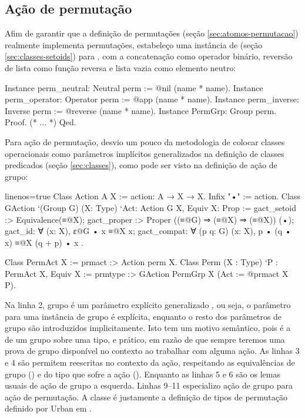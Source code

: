 \subsection{Ação de permutação}
Afim de garantir que a definição de permutações (seção \ref{sec:atomos-permutacao}) realmente implementa permutações, estabeleço uma instância de  (seção \ref{sec:classes-setoids}) para , com a concatenação como operador binário, reversão de lista como função reversa e lista vazia como elemento neutro:
\begin{coqcode}
Instance perm_neutral: Neutral perm := @nil (name * name).
Instance perm_operator: Operator perm := @app (name * name).
Instance perm_inverse: Inverse perm := @reverse (name * name).
Instance PermGrp: Group perm. Proof. (* ... *) Qed.
\end{coqcode}

Para ação de permutação, desvio um pouco da metodologia de colocar classes operacionais como parâmetros implícitos generalizados na definição de classes predicados (seção \ref{sec:classes}), como pode ser visto na definição de ação de grupo:
\begin{coqcode*}{linenos=true}
Class Action A X := action: A → X → X.    Infix "•" := action.
Class GAction `(Group G) (X: Type) `{Act: Action G X, Equiv X}: Prop := {
   gact_setoid :> Equivalence(≡@{X});
   gact_proper :> Proper ((≡@{G}) ⇒ (≡@{X}) ⇒ (≡@{X})) (•);
   gact_id: ∀ (x: X), ɛ@{G} • x ≡@{X} x;
   gact_compat: ∀ (p q: G) (x: X), p • (q • x) ≡@{X} (q + p) • x
}.

Class PermAct X := prmact :> Action perm X.
Class Perm (X : Type) `{P : PermAct X, Equiv X} := 
   prmtype :> GAction PermGrp X (Act := @prmact X P).
\end{coqcode*}
Na linha 2, grupo é um parâmetro explícito generalizado , ou seja, o parâmetro para uma instância de grupo é explícita, enquanto o resto dos parâmetros de grupo são introduzidos implicitamente. Isto tem um motivo semântico, pois é a de um grupo sobre uma tipo, e prático, em razão de que sempre teremos uma prova de grupo disponível no contexto ao trabalhar com alguma ação. As linhas 3 e 4 são permitem reescritas no contexto da ação, respeitando as equivalências de grupo () e do tipo que sofre a ação (). Enquanto as linhas 5 e 6 são os lemas usuais de ação de grupo a esquerda. Linhas 9--11 especializo ação de grupo para ação de permutação. A classe  é justamente a definição de tipos de permutação definido por Urban em \cite{Urban2008}.

